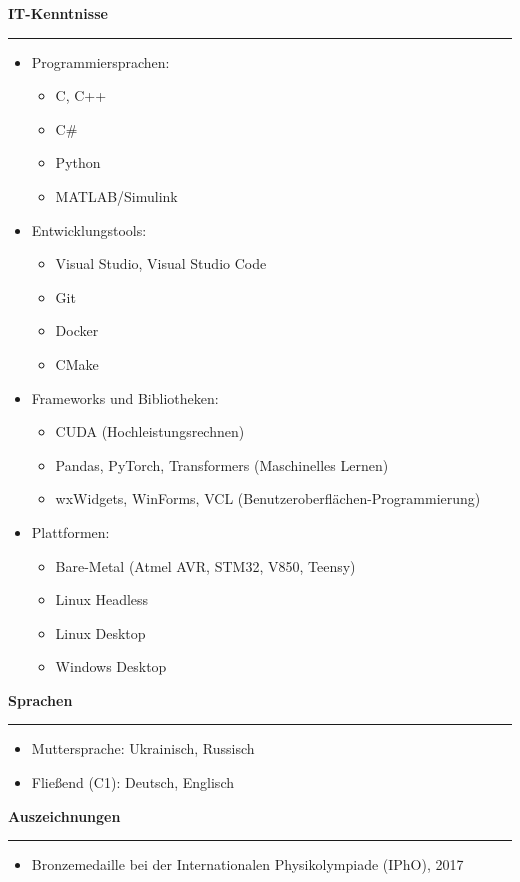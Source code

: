 \documentclass[12pt]{article} %
\newcommand{\HighlightedText}[1] {{\textbf{#1}}}
\newenvironment{ItemizeSection}[1]{
    \vspace{1mm}
    \HighlightedText{#1}
    \vspace{0.5mm}
    {\color{custom_blue} \hrule}
    \begin{itemize}[left=0.5em, topsep=0pt, itemsep=0pt, label={$\bullet$}]
}{
    \end{itemize}
}
\newenvironment{ItemizeSubsection}{
    \begin{itemize}[left=0.5em, topsep=-999pt, itemsep=0pt, label={$\circ$}]
}{
    \end{itemize}
}
\begin{document}
\newpage
\begin{ItemizeSection}{IT-Kenntnisse}
\item Programmiersprachen:
    \begin{ItemizeSubsection}
        \item C, C++
        \item C\#
        \item Python
        \item MATLAB/Simulink
    \end{ItemizeSubsection}
    \item Entwicklungstools:
    \begin{ItemizeSubsection}
        \item Visual Studio, Visual Studio Code
        \item Git
        \item Docker
        \item CMake
    \end{ItemizeSubsection}
    \item Frameworks und Bibliotheken:
    \begin{ItemizeSubsection}
        \item CUDA (Hochleistungsrechnen)
        \item Pandas, PyTorch, Transformers (Maschinelles Lernen)
        \item wxWidgets, WinForms, VCL (Benutzeroberflächen-Programmierung)
    \end{ItemizeSubsection}
    \item Plattformen:
    \begin{ItemizeSubsection}
        \item Bare-Metal (Atmel AVR, STM32, V850, Teensy)
        \item Linux Headless
        \item Linux Desktop
        \item Windows Desktop
    \end{ItemizeSubsection}
\end{ItemizeSection}



\begin{ItemizeSection}{Sprachen}
    \item Muttersprache: Ukrainisch, Russisch
    \item Fließend (C1): Deutsch, Englisch
\end{ItemizeSection}

\begin{ItemizeSection}{Auszeichnungen}
    \item Bronzemedaille bei der Internationalen Physikolympiade (IPhO), 2017
\end{ItemizeSection}
\end{document}
